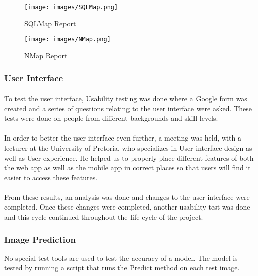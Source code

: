 \documentclass[a4paper, 11pt]{article}
\begin{document}
            \begin{figure}[H]
                \texttt{[image: images/SQLMap.png]}
                \caption{SQLMap Report}
                \label{fig:SQLMap}
            \end{figure}
            \begin{figure}[H]
                \texttt{[image: images/NMap.png]}
                \caption{NMap Report}
                \label{fig:NMap}
            \end{figure}
        
         \subsubsection{User Interface}
            \paragraph{}
            To test the user interface, Usability testing was done where a Google form was created and a series of questions relating to the user interface were asked. These tests were done on people from different backgrounds and skill levels.
            \paragraph{}
            In order to better the user interface even further, a meeting was held, with a lecturer at the University of Pretoria, who specializes in User interface design as well as User experience. He helped us to properly place different features of both the web app as well as the mobile app in correct places so that users will find it easier to access these features.
            \paragraph{}
            From these results, an analysis was done and changes to the user interface were completed. Once these changes were completed, another usability test was done and this cycle continued throughout the life-cycle of the project.
            
        \subsubsection{Image Prediction}
            No special test tools are used to test the accuracy of a model. The model is tested by running a script that runs the Predict method on each test image.
\end{document}
